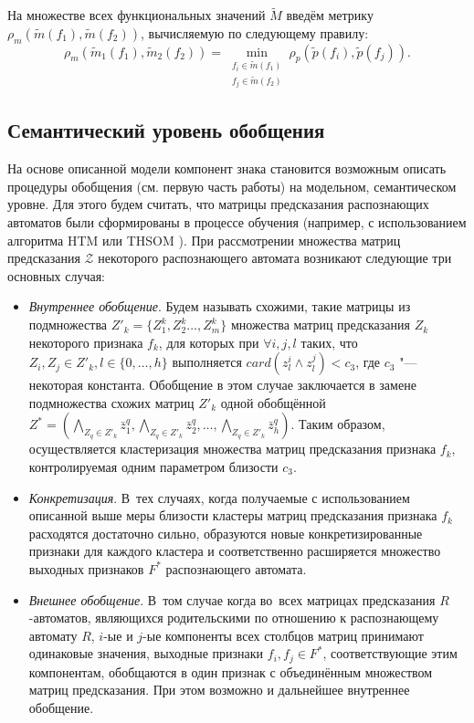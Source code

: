 \documentclass[a4paper, 12pt]{article}
\theoremstyle{plain}
\begin{document}
		На множестве всех функциональных значений $\tilde M$ введём метрику $\rho_m(\tilde m(f_1),\tilde m(f_2))$, вычисляемую по следующему правилу:
		\begin{equation}
			\rho_m(\tilde m_1(f_1),\tilde m_2(f_2 ))=\min\limits_{\substack{f_i\in\tilde m(f_1 )\\f_j\in\tilde m(f_2 )}}\rho_p(\tilde p(f_i ),\tilde p(f_j )).
		\end{equation}
		
	\subsection{Семантический уровень обобщения} На основе описанной модели компонент знака становится возможным описать процедуры обобщения (см. первую часть работы) на модельном, семантическом уровне. Для этого будем считать, что матрицы предсказания распознающих автоматов были сформированы в процессе обучения (например, с использованием алгоритма HTM \cite{Hawkins2009} или THSOM \cite{Koutn2008}). При рассмотрении множества матриц предсказания $\mathcal Z$ некоторого распознающего автомата возникают следующие три основных случая:
	\begin{itemize}
		\item \textit{Внутреннее обобщение}. Будем называть схожими, такие матрицы из подмножества $Z'_k=\{Z_1^k,Z_2^k\dots,Z_m^k\}$ множества матриц предсказания $Z_k$ некоторого признака $f_k$, для которых при $\forall i,j,l$ таких, что $Z_i,Z_j\in Z'_k,l\in\{0,\dots,h\}$ выполняется $card(z_l^i\wedge z_l^j)<c_3$, где $c_3$ "--- некоторая константа. Обобщение в этом случае заключается в замене подмножества схожих матриц $Z'_k$ одной обобщённой $Z^*=(\bigwedge\limits_{Z_q\in Z'_k}\bar z_1^q,\bigwedge\limits_{Z_q\in Z'_k}\bar z_2^q,\dots,\bigwedge\limits_{Z_q\in Z'_k}\bar z_h^q)$. Таким образом, осуществляется кластеризация множества матриц предсказания признака $f_k$, контролируемая одним параметром близости $c_3$.
		\item \textit{Конкретизация}. В~тех случаях, когда получаемые с использованием описанной выше меры близости кластеры матриц предсказания признака $f_k$ расходятся достаточно сильно, образуются новые конкретизированные признаки для каждого кластера и соответственно расширяется множество выходных признаков $F^*$ распознающего автомата.
		\item \textit{Внешнее обобщение}. В~том случае когда во~всех матрицах предсказания $R$-автоматов, являющихся родительскими по отношению к распознающему автомату $R$, $i$-ые и $j$-ые компоненты всех столбцов матриц принимают одинаковые значения, выходные признаки $f_i,f_j\in F^*$, соответствующие этим компонентам, обобщаются в один признак с объединённым множеством матриц предсказания. При этом возможно и дальнейшее внутреннее обобщение.
	\end{itemize}
	
\end{document}
